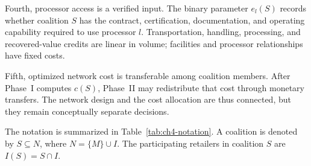 Fourth, processor access is a verified input. The binary parameter $e_l(S)$ records whether coalition $S$ has the contract, certification, documentation, and operating capability required to use processor $l$. Transportation, handling, processing, and recovered-value credits are linear in volume; facilities and processor relationships have fixed costs.

Fifth, optimized network cost is transferable among coalition members. After Phase~I computes $c(S)$, Phase~II may redistribute that cost through monetary transfers. The network design and the cost allocation are thus connected, but they remain conceptually separate decisions.

The notation is summarized in Table~\ref{tab:ch4-notation}. A coalition is denoted by $S\subseteq N$, where $N=\{M\}\cup I$. The participating retailers in coalition $S$ are $I(S)=S\cap I$.

